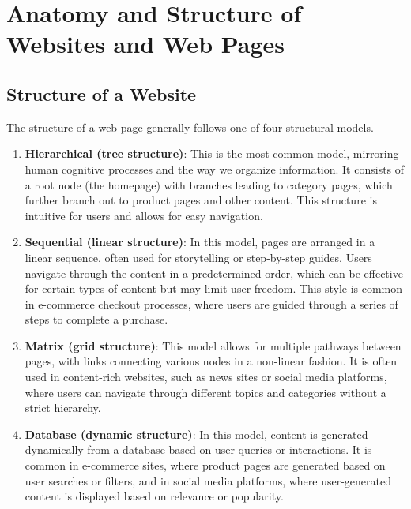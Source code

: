 \section{Anatomy and Structure of Websites and Web Pages}\label{sec:structure_of_the_web}

\subsection{Structure of a Website}\label{subsec:structure-of-a-website}

The structure of a web page generally follows one of four structural models\cite{Reyes_2025}.
\begin{enumerate}

    \item \textbf{Hierarchical (tree structure)}: This is the most common model, mirroring human cognitive processes and the way we organize information.
    It consists of a root node (the homepage) with branches leading to category pages, which further branch out to product pages and other content.
    This structure is intuitive for users and allows for easy navigation.

    \item \textbf{Sequential (linear structure)}: In this model, pages are arranged in a linear sequence, often used for storytelling or step-by-step guides.
    Users navigate through the content in a predetermined order, which can be effective for certain types of content but may limit user freedom.
    This style is common in e-commerce checkout processes, where users are guided through a series of steps to complete a purchase.

    \item \textbf{Matrix (grid structure)}: This model allows for multiple pathways between pages, with links connecting various nodes in a non-linear fashion.
    It is often used in content-rich websites, such as news sites or social media platforms, where users can navigate through different topics and categories without a strict hierarchy.

    \item \textbf{Database (dynamic structure)}: In this model, content is generated dynamically from a database based on user queries or interactions.
    It is common in e-commerce sites, where product pages are generated based on user searches or filters, and in social media platforms, where user-generated content is displayed based on relevance or popularity.
\end{enumerate}

